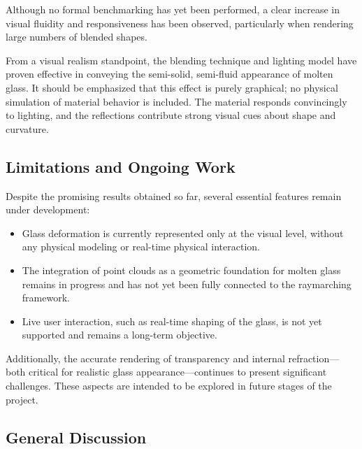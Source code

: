 \documentclass{rapportcs}
\begin{document}
        Although no formal benchmarking has yet been performed, a clear increase in visual fluidity and responsiveness has been observed, particularly when rendering large numbers of blended shapes.\
        
        From a visual realism standpoint, the blending technique and lighting model have proven effective in conveying the semi-solid, semi-fluid appearance of molten glass. It should be emphasized that this effect is purely graphical; no physical simulation of material behavior is included. The material responds convincingly to lighting, and the reflections contribute strong visual cues about shape and curvature.

    \subsection{Limitations and Ongoing Work}
    
        Despite the promising results obtained so far, several essential features remain under development:
        
        \begin{itemize}
            \item Glass deformation is currently represented only at the visual level, without any physical modeling or real-time physical interaction.\\
        
            \item The integration of point clouds as a geometric foundation for molten glass remains in progress and has not yet been fully connected to the raymarching framework.\\
        
            \item Live user interaction, such as real-time shaping of the glass, is not yet supported and remains a long-term objective.\\
        \end{itemize}
        
       Additionally, the accurate rendering of transparency and internal refraction—both critical for realistic glass appearance—continues to present significant challenges. These aspects are intended to be explored in future stages of the project.

    \newpage

    \subsection{General Discussion}
\end{document}
